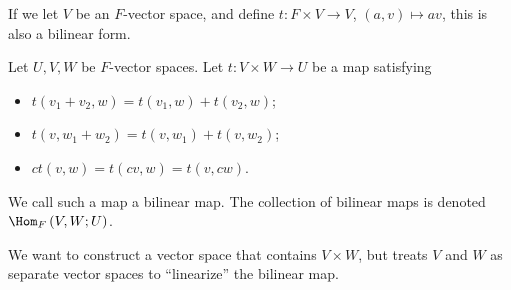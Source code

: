 \documentclass[10pt]{mypackage}
\begin{document}
  \begin{example}
    If we let $V$ be an $F$-vector space, and define $t: F\times V\rightarrow V$, $\left(a,v\right)\mapsto av$, this is also a bilinear form.
  \end{example}
  \begin{definition}
    Let $U,V,W$ be $F$-vector spaces. Let $t: V\times W\rightarrow U$ be a map satisfying
    \begin{itemize}
      \item $t\left(v_1 + v_2,w\right) = t\left(v_1,w\right) + t\left(v_2,w\right)$;
      \item $t\left(v,w_1 + w_2\right) = t\left(v,w_1\right) + t\left(v,w_2\right)$;
      \item $ct\left(v,w\right) = t\left(cv,w\right) = t\left(v,cw\right)$.
    \end{itemize}
    We call such a map a bilinear map. The collection of bilinear maps is denoted $\Hom_{F}\left(V,W;U\right)$.
  \end{definition}
  We want to construct a vector space that contains $V\times W$, but treats $V$ and $W$ as separate vector spaces to ``linearize'' the bilinear map.\newline
\end{document}
